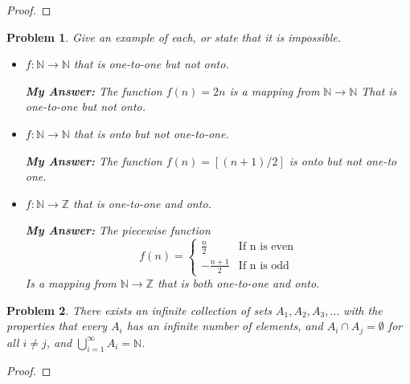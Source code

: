 \documentclass[12pt]{article}
\newtheorem{problem}{Problem}
\newcommand{\NN}{\ensuremath{\mathbb N}}
\newcommand{\ZZ}{\ensuremath{\mathbb Z}}
\begin{document}

\begin{proof}
%
\end{proof}


\begin{problem} %
Give an example of each, or state that it is impossible.
\begin{itemize}
\item[(a)] $f:\NN\to\NN$ that is one-to-one but not onto.

	\textbf{My Answer: } The function $f(n) = 2n$ is a mapping from $\NN \rightarrow \NN$ That is one-to-one but not onto.
\item[(b)] $f:\NN\to\NN$ that is onto but not one-to-one.

	\textbf{My Answer: } The function $f(n) = [(n+1)/2]$ is onto but not one-to one.
\item[(d)] $f:\NN\to\ZZ$ that is one-to-one and onto.

	\textbf{My Answer: } The piecewise function $$f(n) =\begin{cases} \frac{n}{2} & \text{If n is even} \\
	-\frac{n+1}{2} & \text{If n is odd}\end{cases} $$
		Is a mapping from $\NN \rightarrow \ZZ$ that is both one-to-one and onto.
	

\end{itemize}
\end{problem}



\begin{problem} %
There exists an infinite collection of sets $A_1,A_2,A_3,\dots$ with the properties that every $A_i$ has an infinite number of elements, and $A_i\cap A_j=\emptyset$ for all $i\ne j$, and $\bigcup_{i=1}^\infty A_i=\NN$. \end{problem}

\begin{proof}
\end{proof}
\end{document}
